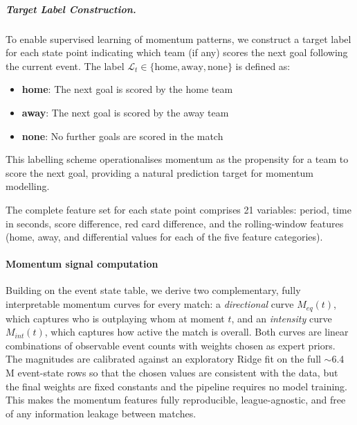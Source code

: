 \documentclass[pdflatex,sn-mathphys-num]{sn-jnl}
\theoremstyle{thmstyleone}
\theoremstyle{thmstyletwo}
\theoremstyle{thmstylethree}
\begin{document}
\subparagraph{Target Label Construction.}
To enable supervised learning of momentum patterns, we construct a target label for each state point indicating which team (if any) scores the next goal following the current event. The label $\mathcal{L}_t \in \{\text{home}, \text{away}, \text{none}\}$ is defined as:
\begin{itemize}
    \item \textbf{home}: The next goal is scored by the home team
    \item \textbf{away}: The next goal is scored by the away team
    \item \textbf{none}: No further goals are scored in the match
\end{itemize}

This labelling scheme operationalises momentum as the propensity for a team to score the next goal, providing a natural prediction target for momentum modelling.

The complete feature set for each state point comprises 21 variables: period, time in seconds, score difference, red card difference, and the rolling-window features (home, away, and differential values for each of the five feature categories).

\paragraph{Momentum signal computation}\label{sec:momentum_computation}

Building on the event state table, we derive two complementary,
fully interpretable momentum curves for every match: a
\emph{directional} curve $M_{eq}(t)$, which captures who is outplaying
whom at moment $t$, and an \emph{intensity} curve $M_{int}(t)$, which
captures how active the match is overall. Both curves are linear
combinations of observable event counts with weights chosen as expert
priors. The magnitudes are calibrated against an exploratory Ridge fit
on the full $\sim$6.4 M event-state rows so that the chosen values are
consistent with the data, but the final weights are fixed constants and
the pipeline requires no model training. This makes the momentum
features fully reproducible, league-agnostic, and free of any
information leakage between matches.
\end{document}
